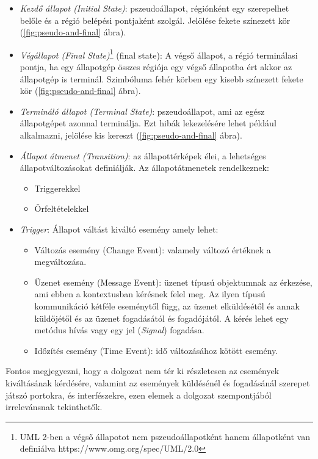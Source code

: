 \begin{itemize}
	\item \emph{Kezdő állapot (Initial State)}: pszeudoállapot, régiónként egy szerepelhet belőle és a régió belépési pontjaként szolgál. Jelölése fekete színezett kör (\ref{fig:pseudo-and-final} ábra).
	\item \emph{Végállapot (Final State)}\footnote{UML 2-ben a végső állapotot nem pszeudoállapotként hanem állapotként van definiálva https://www.omg.org/spec/UML/2.0} (final state): A végső állapot, a régió terminálasi pontja, ha egy állapotgép összes régiója egy végső állapotba ért akkor az állapotgép is terminál. Szimbóluma fehér körben egy kisebb színezett fekete kör (\ref{fig:pseudo-and-final} ábra).
	\item \emph{Termináló állapot (Terminal State)}: pszeudoállapot, ami az egész állapotgépet azonnal terminálja. Ezt hibák lekezelésére lehet például alkalmazni, jelölése kis kereszt (\ref{fig:pseudo-and-final} ábra).
	\item \emph{Állapot átmenet (Transition)}: az állapottérképek élei, a lehetséges állapotváltozásokat definiálják. Az állapotátmenetek rendelkeznek:
		\begin{itemize}
			\item Triggerekkel
			\item Őrfeltételekkel
		\end{itemize}
	\item \emph{Trigger}: Állapot váltást kiváltó esemény amely lehet:
	\begin{itemize}
		\item Változás esemény (Change Event): valamely változó értéknek a megváltozása.
		\item Üzenet esemény (Message Event): üzenet típusú objektumnak az érkezése, ami ebben a kontextusban kérésnek felel meg. Az ilyen típusú kommunikáció kétféle eseménytől függ, az üzenet elküldésétől és annak küldőjétől és az üzenet fogadásától és fogadójától. A kérés lehet egy metódus hívás vagy egy jel (\emph{Signal}) fogadása.
		\item Időzítés esemény (Time Event): idő változásához kötött esemény.
	\end{itemize}

\end{itemize}
Fontos megjegyezni, hogy a dolgozat nem tér ki részletesen az események kiváltásának kérdésére, valamint az események küldésénél és fogadásánál szerepet játszó portokra, és interfészekre, ezen elemek a dolgozat szempontjából irrelevánsnak tekinthetők.
